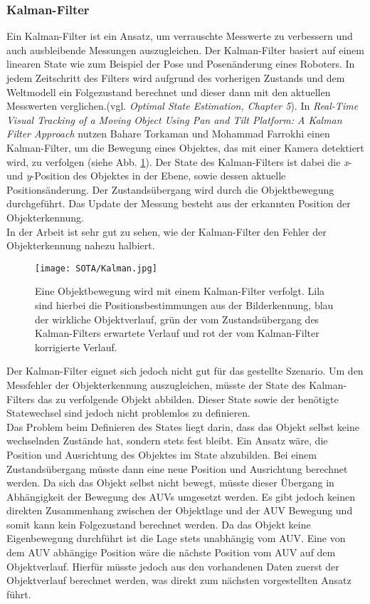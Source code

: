 \subsubsection{Kalman-Filter}
Ein Kalman-Filter ist ein Ansatz, um verrauschte Messwerte zu verbessern und auch ausbleibende Messungen auszugleichen. Der Kalman-Filter basiert auf einem linearen State wie zum Beispiel der Pose und Posenänderung eines Roboters. In jedem Zeitschritt des Filters wird aufgrund des vorherigen Zustands und dem Weltmodell ein Folgezustand berechnet und dieser dann mit den aktuellen Messwerten verglichen.(vgl. \textit{Optimal State Estimation, Chapter 5}\cite{simon2006optimal}).
In \textit{Real-Time Visual Tracking of a Moving Object Using Pan and Tilt Platform: A Kalman Filter Approach}\cite{torkaman2012real} nutzen Bahare Torkaman und Mohammad Farrokhi einen Kalman-Filter, um die Bewegung eines Objektes, das mit einer Kamera detektiert wird, zu verfolgen (siehe Abb. \ref{kalmanFilter}). Der State des Kalman-Filters ist dabei die \textit{x}- und \textit{y}-Position des Objektes in der Ebene, sowie dessen aktuelle Positionsänderung. Der Zustandsübergang wird durch die Objektbewegung durchgeführt. Das Update der Messung besteht aus der erkannten Position der Objekterkennung.\\
In der Arbeit ist sehr gut zu sehen, wie der Kalman-Filter den Fehler der Objekterkennung nahezu halbiert.\\
\begin{figure}[H]
\centering
\texttt{[image: SOTA/Kalman.jpg]}
\caption[Schätzung einer Objektbewegung mit Kalman-Filter.]{Eine Objektbewegung wird mit einem Kalman-Filter verfolgt. Lila sind hierbei die Positionsbestimmungen aus der Bilderkennung, blau der wirkliche Objektverlauf, grün der vom Zustandsübergang des Kalman-Filters erwartete Verlauf und rot der vom Kalman-Filter korrigierte Verlauf.}
\label{kalmanFilter}
\end{figure}
Der Kalman-Filter eignet sich jedoch nicht gut für das gestellte Szenario. Um den Messfehler der Objekterkennung auszugleichen, müsste der State des Kalman-Filters das zu verfolgende Objekt abbilden. Dieser State sowie der benötigte Statewechsel sind jedoch nicht problemlos zu definieren.\\
Das Problem beim Definieren des States liegt darin, dass das Objekt selbst keine wechselnden Zustände hat, sondern stets fest bleibt. Ein Ansatz wäre, die Position und Ausrichtung des Objektes im State abzubilden. Bei einem Zustandsübergang müsste dann eine neue Position und Ausrichtung berechnet werden. Da sich das Objekt selbst nicht bewegt, müsste dieser Übergang in Abhängigkeit der Bewegung des AUVs umgesetzt werden. Es gibt jedoch keinen direkten Zusammenhang zwischen der Objektlage und der AUV Bewegung und somit kann kein Folgezustand berechnet werden. Da das Objekt keine Eigenbewegung durchführt ist die Lage stets unabhängig vom AUV. Eine von dem AUV abhängige Position wäre die nächste Position vom AUV auf dem Objektverlauf. Hierfür müsste jedoch aus den vorhandenen Daten zuerst der Objektverlauf berechnet werden, was direkt zum nächsten vorgestellten Ansatz führt.
